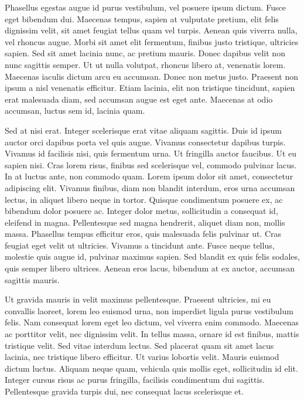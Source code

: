Phasellus egestas augue id purus vestibulum, vel posuere ipsum dictum. Fusce eget bibendum dui. Maecenas tempus, sapien at vulputate pretium, elit felis dignissim velit, sit amet feugiat tellus quam vel turpis. Aenean quis viverra nulla, vel rhoncus augue. Morbi sit amet elit fermentum, finibus justo tristique, ultricies sapien. Sed sit amet lacinia nunc, ac pretium mauris. Donec dapibus velit non nunc sagittis semper. Ut ut nulla volutpat, rhoncus libero at, venenatis lorem. Maecenas iaculis dictum arcu eu accumsan. Donec non metus justo. Praesent non ipsum a nisl venenatis efficitur. Etiam lacinia, elit non tristique tincidunt, sapien erat malesuada diam, sed accumsan augue est eget ante. Maecenas at odio accumsan, luctus sem id, lacinia quam.

Sed at nisi erat. Integer scelerisque erat vitae aliquam sagittis. Duis id ipsum auctor orci dapibus porta vel quis augue. Vivamus consectetur dapibus turpis. Vivamus id facilisis nisi, quis fermentum urna. Ut fringilla auctor faucibus. Ut eu sapien nisi. Cras lorem risus, finibus sed scelerisque vel, commodo pulvinar lacus. In at luctus ante, non commodo quam.
Lorem ipsum dolor sit amet, consectetur adipiscing elit. Vivamus finibus, diam non blandit interdum, eros urna accumsan lectus, in aliquet libero neque in tortor. Quisque condimentum posuere ex, ac bibendum dolor posuere ac. Integer dolor metus, sollicitudin a consequat id, eleifend in magna. Pellentesque sed magna hendrerit, aliquet diam non, mollis massa. Phasellus tempus efficitur eros, quis malesuada felis pulvinar ut. Cras feugiat eget velit ut ultricies. Vivamus a tincidunt ante. Fusce neque tellus, molestie quis augue id, pulvinar maximus sapien. Sed blandit ex quis felis sodales, quis semper libero ultrices. Aenean eros lacus, bibendum at ex auctor, accumsan sagittis mauris.

Ut gravida mauris in velit maximus pellentesque. Praesent ultricies, mi eu convallis laoreet, lorem leo euismod urna, non imperdiet ligula purus vestibulum felis. Nam consequat lorem eget leo dictum, vel viverra enim commodo. Maecenas ac porttitor velit, nec dignissim velit. In tellus massa, ornare id est finibus, mattis tristique velit. Sed vitae interdum lectus. Sed placerat quam sit amet lacus lacinia, nec tristique libero efficitur. Ut varius lobortis velit. Mauris euismod dictum luctus. Aliquam neque quam, vehicula quis mollis eget, sollicitudin id elit. Integer cursus risus ac purus fringilla, facilisis condimentum dui sagittis. Pellentesque gravida turpis dui, nec consequat lacus scelerisque et.

